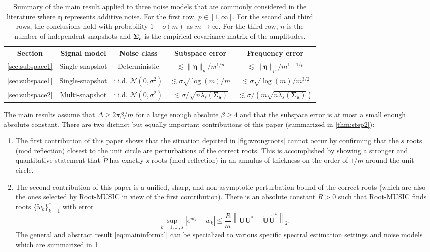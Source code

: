 \documentclass[11pt]{article}
\theoremstyle{definition}
\numberwithin{theorem}{section}
\numberwithin{equation}{section}
\renewcommand{\tilde}{\widetilde}
\newcommand{\bfa}{{\boldsymbol a}}
\newcommand{\bfU}{{\boldsymbol U}}
\newcommand{\bfeta}{{\boldsymbol \eta}}
\newcommand{\bfSigma}{{\boldsymbol \Sigma}}
\newcommand{\calN}{\mathcal{N}}
\numberwithin{equation}{section}
\begin{document}
\begin{table}[ht]
    \centering
    \begin{tabular}{|c|c|c|c|c|} \hline
         {\bf Section} &{\bf Signal model} &{\bf Noise class} &{\bf Subspace error} &{\bf Frequency error} \\\hline 
         \cref{sec:subspace1} &Single-snapshot &Deterministic &$\lesssim \|\bfeta\|_p/m^{1/p}$ &$\lesssim \|\bfeta\|_p/m^{1+1/p}$ \\ \hline 
         \cref{sec:subspace1} &Single-snapshot &i.i.d. $\calN(0,\sigma^2)$ &$\lesssim \sigma \sqrt{\log(m)/ m}$ &$\lesssim \sigma \sqrt{\log(m)}/ m^{3/2}$ \\ \hline 
         \cref{sec:subspace2} &Multi-snapshot &i.i.d. $\calN(0,\sigma^2)$ &$\lesssim \sigma/\sqrt{n\lambda_s(\bfSigma_\bfa)}$ &$\lesssim \sigma / (m \sqrt{n\lambda_s(\bfSigma_\bfa)})$ \\ \hline 
    \end{tabular}
    \caption{Summary of the main result applied to three noise models that are commonly considered in the literature where $\bfeta$ represents additive noise. For the first row, $p\in [1,\infty]$. For the second and third rows, the conclusions hold with probability $1-o(m)$ as $m\to\infty$. For the third row, $n$ is the number of independent snapshots and $\bfSigma_\bfa$ is the empirical covariance matrix of the amplitudes.}
    \label{table:mainresults}
\end{table}

The main results assume that $\Delta\geq 2\pi \beta/m$ for a large enough absolute $\beta\geq 4$ and that the subspace error is at most a small enough absolute constant. There are two distinct but equally important contributions of this paper (summarized in \cref{thm:step2}):
\begin{enumerate}
    \item 
    The first contribution of this paper shows that the situation depicted in \cref{fig:wrongroots} cannot occur by confirming that the $s$ roots (mod reflection) closest to the unit circle are perturbations of the correct roots. 
    This is accomplished by showing a stronger and quantitative statement that $\tilde P$ has exactly $s$ roots (mod reflection) in an annulus of thickness on the order of $1/m$ around the unit circle. 
    \item 
    The second contribution of this paper is a unified, sharp, and non-asymptotic perturbation bound of the correct roots (which are also the ones selected by Root-MUSIC in view of the first contribution). There is an absolute constant $R>0$ such that Root-MUSIC finds roots $\{\tilde w_k\}_{k=1}^s$ with error
    \begin{equation}
        \label{eq:maininformal}
        \sup_{k=1,\dots,s} \left|e^{i\theta_k}-\tilde w_k \right|
        \leq \frac{R}{m} \left\|\bfU\bfU^*-\tilde \bfU\tilde \bfU^* \right\|_2.
    \end{equation}
    The general and abstract result \eqref{eq:maininformal} can be specialized to various specific spectral estimation settings and noise models which are summarized in \cref{table:mainresults}. 
\end{enumerate}
\end{document}
